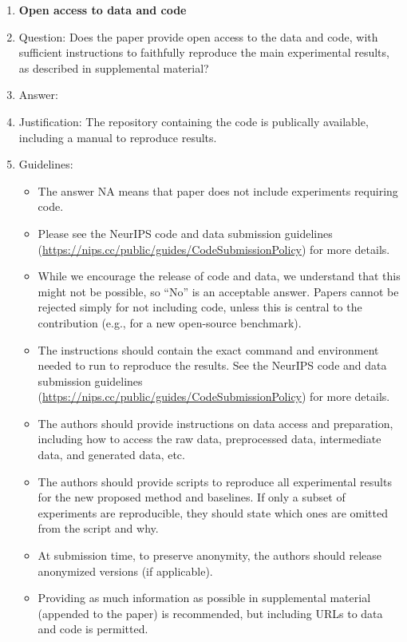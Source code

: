 \documentclass{article}
\begin{document}
\begin{enumerate}
\item {\bf Open access to data and code}
    \item[] Question: Does the paper provide open access to the data and code, with sufficient instructions to faithfully reproduce the main experimental results, as described in supplemental material?
    \item[] Answer: \answerYes{} %
    \item[] Justification: The repository containing the code is publically available, including a manual to reproduce results.
    \item[] Guidelines:
    \begin{itemize}
        \item The answer NA means that paper does not include experiments requiring code.
        \item Please see the NeurIPS code and data submission guidelines (\url{https://nips.cc/public/guides/CodeSubmissionPolicy}) for more details.
        \item While we encourage the release of code and data, we understand that this might not be possible, so “No” is an acceptable answer. Papers cannot be rejected simply for not including code, unless this is central to the contribution (e.g., for a new open-source benchmark).
        \item The instructions should contain the exact command and environment needed to run to reproduce the results. See the NeurIPS code and data submission guidelines (\url{https://nips.cc/public/guides/CodeSubmissionPolicy}) for more details.
        \item The authors should provide instructions on data access and preparation, including how to access the raw data, preprocessed data, intermediate data, and generated data, etc.
        \item The authors should provide scripts to reproduce all experimental results for the new proposed method and baselines. If only a subset of experiments are reproducible, they should state which ones are omitted from the script and why.
        \item At submission time, to preserve anonymity, the authors should release anonymized versions (if applicable).
        \item Providing as much information as possible in supplemental material (appended to the paper) is recommended, but including URLs to data and code is permitted.
    \end{itemize}



\end{enumerate}
\end{document}
